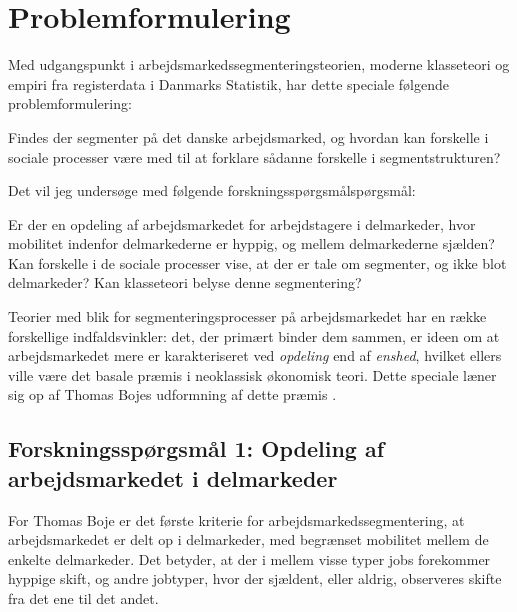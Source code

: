 \section{Problemformulering}
%
Med udgangspunkt i arbejdsmarkedssegmenteringsteorien, moderne klasseteori og empiri fra registerdata i Danmarks Statistik, har dette speciale følgende problemformulering:
%
\vspace{\baselineskip}
%
\begin{tcolorbox}[title=\textbf{Problemformulering}]
Findes der segmenter på det danske arbejdsmarked, og hvordan kan forskelle i sociale processer være med til at forklare sådanne forskelle i segmentstrukturen?
\end{tcolorbox}
%
\vspace{\baselineskip}
Det vil jeg undersøge med følgende forskningsspørgsmålspørgsmål:
\vspace{\baselineskip}
\begin{tcolorbox}[title=Forskningspørgsmål,
subtitle style={boxrule=0.4pt} ]
	 Er der en opdeling af arbejdsmarkedet for arbejdstagere i delmarkeder, hvor mobilitet indenfor delmarkederne er hyppig, og mellem delmarkederne sjælden?
	 Kan forskelle i de sociale processer vise, at der er tale om segmenter, og ikke blot delmarkeder?
	 Kan klasseteori belyse denne segmentering?
\end{tcolorbox}

Teorier med blik for segmenteringsprocesser på arbejdsmarkedet har en række forskellige indfaldsvinkler: det, der primært binder dem sammen, er ideen om at arbejdsmarkedet mere er karakteriseret ved \emph{opdeling} end af \emph{enshed}, hvilket ellers ville være det basale præmis i neoklassisk økonomisk teori. Dette speciale læner sig op af Thomas Bojes udformning af dette præmis \parencite[174]{Boje1986}.


\subsection{Forskningsspørgsmål 1: Opdeling af arbejdsmarkedet i delmarkeder}

For Thomas Boje er det første kriterie for arbejdsmarkedssegmentering, at arbejdsmarkedet er delt op i delmarkeder, med begrænset mobilitet mellem de enkelte delmarkeder. Det betyder, at der i mellem visse typer jobs forekommer hyppige skift, og andre jobtyper, hvor der sjældent, eller aldrig, observeres skifte fra det ene til det andet.

